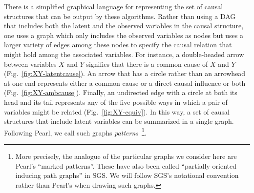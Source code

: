 \documentclass[12pt,onecolumn,nofootinbib]{revtex4-2}
\begin{document}
There is a simplified graphical language for representing the set of causal structures that can be output by these algorithms.  Rather than using a DAG that includes both the latent and the observed variables in the causal structure, one uses a graph which only includes the observed variables as nodes but uses a larger variety of edges among these nodes to specify the causal relation that might hold among the associated variables.
For instance, a double-headed arrow between variables $X$ and $Y$ signifies that there is a common cause of $X$ and $Y$ (Fig.~\ref{fig:XY-latentcause}). An
arrow that has a circle rather than an arrowhead at one end represents either a common cause or a direct causal influence or both (Fig.~\ref{fig:XY-ambcause}).
Finally, an undirected edge with a circle at both its head and its tail represents any of the five possible ways in which a pair of variables might be related (Fig.~\ref{fig:XY-equiv}).  In this way, a set of causal structures that include latent variables can be summarized in a single graph.  Following Pearl, we call such graphs \emph{patterns}~\footnote{More precisely, the analogue of the particular graphs we consider here are Pearl's ``marked patterns''. These have also been called ``partially oriented inducing path graphs'' in SGS.  We will follow SGS's notational convention rather than Pearl's when drawing such graphs.}.
\end{document}
